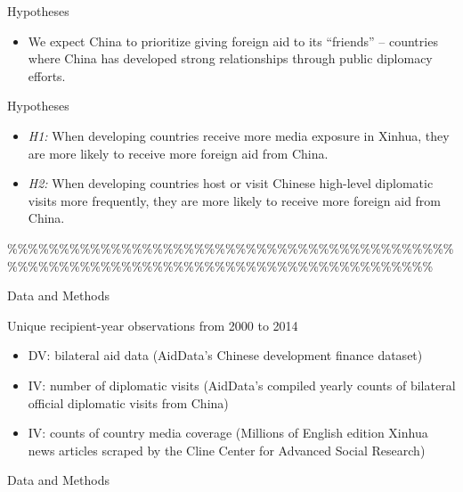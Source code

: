 \documentclass[
  ignorenonframetext,
]{beamer}
\begin{document}
\begin{frame}
\begin{frame}{Hypotheses}
\begin{itemize}
\item We expect China to prioritize giving foreign
aid to its “friends” -- countries where China has developed strong relationships through
public diplomacy efforts.

\end{itemize}

\end{frame}

\begin{frame}{Hypotheses} 

\begin{itemize} 
    \item \textit{H1:} When developing countries receive more media exposure in Xinhua, they are more
likely to receive more foreign aid from China.
    \item \textit{H2:} When developing countries host or visit Chinese high-level diplomatic visits more
frequently, they are more likely to receive more foreign aid from China.
\end{itemize}

\end{frame}

\%\%\%\%\%\%\%\%\%\%\%\%\%\%\%\%\%\%\%\%\%\%\%\%\%\%\%\%\%\%\%\%\%\%\%\%\%\%\%\%\%\%\%\%\%\%\%\%\%\%\%\%\%\%\%\%\%\%\%\%\%\%\%\%\%\%\%\%\%\%\%\%\%\%\%\%\%\%\%\%\%\%\%\%

\begin{frame}{Data and Methods}

Unique recipient-year observations from 2000 to 2014

\begin{itemize} 

\item DV: bilateral aid data (AidData’s Chinese development finance dataset)

\item IV: number of diplomatic visits (AidData’s compiled yearly counts of bilateral official
diplomatic visits from China)

\item IV: counts of country media coverage (Millions of English edition Xinhua news articles scraped by the Cline Center for Advanced Social Research)


\end{itemize}

\end{frame}

\begin{frame}{Data and Methods}


\end{frame}
\end{frame}
\end{document}
